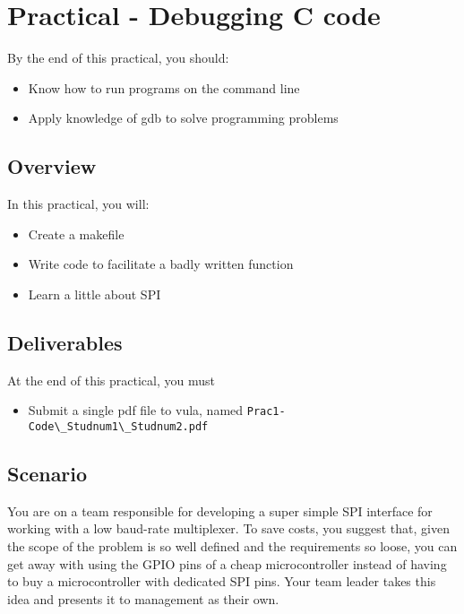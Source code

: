 \section{Practical - Debugging C code}

By the end of this practical, you should:
\begin{itemize}
    \item Know how to run programs on the command line
    \item Apply knowledge of gdb to solve programming problems
\end{itemize}

\subsection{Overview}
In this practical, you will:
\begin{itemize}
    \item Create a makefile
    \item Write code to facilitate a badly written function
    \item Learn a little about SPI
\end{itemize}

\subsection{Deliverables}
At the end of this practical, you must
\begin{itemize}
    \item Submit a single pdf file to vula, named \verb|Prac1-Code\_Studnum1\_Studnum2.pdf|
\end{itemize}

\subsection{Scenario}
You are on a team responsible for developing a super simple SPI interface for working with a low baud-rate multiplexer. To save costs, you suggest that, given the scope of the problem is so well defined and the requirements so loose, you can get away with using the GPIO pins of a cheap microcontroller instead of having to buy a microcontroller with dedicated SPI pins. Your team leader takes this idea and presents it to management as their own.

